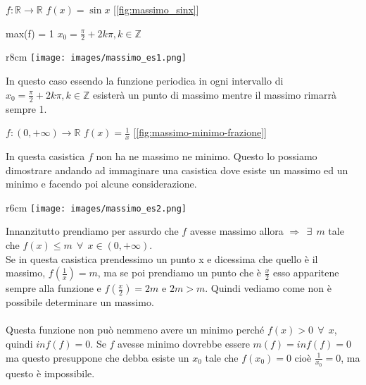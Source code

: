 \begin{example}
    $f: \mathbb{R} \longrightarrow \mathbb{R}$ \hspace{.3cm} $f(x) = \sin{x}$ [\ref{fig:massimo_sinx}]
\end{example}
max(f) = 1 \hspace{.3cm} $x_0 = \frac{\pi}{2} + 2k\pi, k \in \mathbb{Z}$\\
\begin{wrapfigure}[4]{r}{8cm}
    \vspace{-45pt}
    \centering
    \texttt{[image: images/massimo\_es1.png]}
    \caption{funzione $f(x) = \sin{x}$}
    \label{fig:massimo_sinx}
\end{wrapfigure}
In questo caso essendo la funzione periodica in ogni intervallo di $x_0 = \frac{\pi}{2} + 2k\pi, k \in \mathbb{Z}$ esisterà un punto di massimo mentre il massimo rimarrà sempre 1.
\newpage
\begin{example}
    $f:(0, +\infty) \longrightarrow \mathbb{R}$ \hspace{.3cm} $f(x) = \frac{1}{x}$ [\ref{fig:massimo-minimo-frazione}]
\end{example}
In questa casistica $f$ non ha ne massimo ne minimo. Questo lo possiamo dimostrare andando ad immaginare una casistica dove esiste un massimo ed un minimo e facendo poi alcune considerazione. \\
\begin{wrapfigure}{r}{6cm}
    \vspace{-15pt}
    \centering
    \texttt{[image: images/massimo\_es2.png]}
    \caption{funzione $f(x) = \frac{1}{x}$}
    \label{fig:massimo-minimo-frazione}
\end{wrapfigure}
Innanzitutto prendiamo per assurdo che $f$ avesse massimo allora $\Longrightarrow \: \: \exists \: \: m$ tale che $f(x) \leq m \: \: \forall \: \: x \in (0, +\infty)$. \\ Se in questa casistica prendessimo un punto x e dicessima che quello è il massimo, $f(\frac{1}{x}) = m$, ma se poi prendiamo un punto che è $\frac{x}{2}$ esso apparitene sempre alla funzione e $f(\frac{x}{2}) = 2m$ e $2m > m$. Quindi vediamo come non è possibile determinare un massimo.\\ \\
Questa funzione non può nemmeno avere un minimo perché $f(x) > 0 \: \: \forall \: \: x$, quindi $inf(f) = 0$. Se $f$ avesse minimo dovrebbe essere $m(f) = inf(f) = 0$ ma questo presuppone che debba esiste un $x_0$ tale che $f(x_0) = 0$ cioè $\frac{1}{x_0} = 0$, ma questo è impossibile.\\
